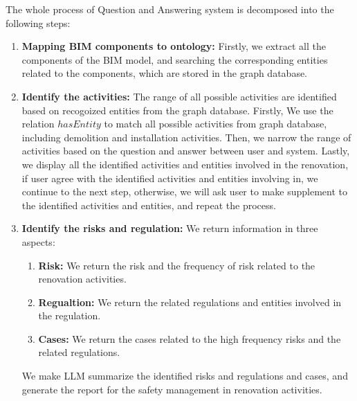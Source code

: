 The whole process of Question and Answering system is decomposed into the following steps:
\begin{enumerate}
    \item \textbf{Mapping BIM components to ontology: } 
    Firstly, we extract all the components of the BIM model, and searching the corresponding entities related to the components,
    which are stored in the graph database.
    \item \textbf{Identify the activities: }
    The range of all possible activities are identified based on recogoized entities from the graph database. 
    Firstly, We use the relation $hasEntity$ to match all possible activities from graph database, including demolition and installation activities. 
    Then, we narrow the range of activities based on the question and answer between user and system. 
    Lastly, we display all the identified activities and entities involved in the renovation, 
    if user agree with the identified activities and entities involving in, we continue to the next step,
    otherwise, we will ask user to make supplement to the identified activities and entities, and repeat the process.
    \item \textbf{Identify the risks and regulation: }
    We return information in three aspects:
    \begin{enumerate}
        \item \textbf{Risk: } 
        We return the risk and the frequency of risk related to the renovation activities.
        \item \textbf{Regualtion: }
        We return the related regulations and entities involved in the regulation.
        \item \textbf{Cases: }
        We return the cases related to the high frequency risks and the related regulations.
    \end{enumerate}

    We make LLM summarize the identified risks and regulations and cases, and generate the report for the safety management in renovation activities.
\end{enumerate}

